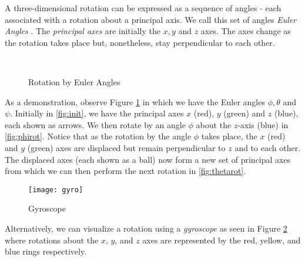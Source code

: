  A three-dimensional rotation can be expressed as a sequence of angles - each associated with a rotation about a principal axis. We call this set of angles \emph{Euler Angles} \cite{lerios} \cite{goldstein} \cite{strauch}. The \emph{principal axes} are initially the $x, y$ and $z$ axes. The axes change as the rotation takes place but, nonetheless, stay perpendicular to each other. 

\begin{figure}[H]
	\centering
	\qquad
	\\
	\qquad
	\caption{\cite{strauch} \cite{goldstein} Rotation by Euler Angles}
	\label{eulerang}
\end{figure}

 As a demonstration, observe Figure \ref{eulerang} in which we have the Euler angles $\phi, \theta$ and $\psi$. Initially in \ref{fig:init}, we have the principal axes $x$ (red), $y$ (green) and $z$ (blue), each shown as arrows. We then rotate by an angle $\phi$ about the $z$-axis (blue) in \ref{fig:phirot}. Notice that as the rotation by the angle $\phi$ takes place, the $x$ (red) and $y$ (green) axes are displaced but remain perpendicular to $z$ and to each other. The displaced axes (each shown as a ball) now form a new set of principal axes from which we can then perform the next rotation in \ref{fig:thetarot}. 

 \begin{figure}[H]
 	\centering
	\texttt{[image: gyro]}
 	\caption{Gyroscope}
 	\label{gyroscope}
 \end{figure}

 Alternatively, we can visualize a rotation using a \emph{gyroscope} as seen in Figure \ref{gyroscope} where rotations about the $x$, $y$, and $z$ axes are represented by the red, yellow, and blue rings respectively.
 
